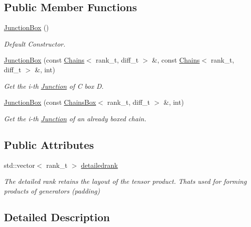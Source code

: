 \subsection*{Public Member Functions}
\begin{DoxyCompactItemize}
\item 
\hyperlink{classMackey_1_1JunctionBox_a6cc2a3bbcbf3e89d7079856b5d16cba4}{Junction\+Box} ()
\begin{DoxyCompactList}\small\item\em Default Constructor. \end{DoxyCompactList}\item 
\hyperlink{classMackey_1_1JunctionBox_ad1847b0ee8aaa343521366f2ff85b7bf}{Junction\+Box} (const \hyperlink{classMackey_1_1Chains}{Chains}$<$ rank\+\_\+t, diff\+\_\+t $>$ \&, const \hyperlink{classMackey_1_1Chains}{Chains}$<$ rank\+\_\+t, diff\+\_\+t $>$ \&, int)
\begin{DoxyCompactList}\small\item\em Get the i-\/th \hyperlink{classMackey_1_1Junction}{Junction} of C box D. \end{DoxyCompactList}\item 
\hyperlink{classMackey_1_1JunctionBox_abd78f76fdc5f83906046e44c6901c54d}{Junction\+Box} (const \hyperlink{classMackey_1_1ChainsBox}{Chains\+Box}$<$ rank\+\_\+t, diff\+\_\+t $>$ \&, int)
\begin{DoxyCompactList}\small\item\em Get the i-\/th \hyperlink{classMackey_1_1Junction}{Junction} of an already boxed chain. \end{DoxyCompactList}\end{DoxyCompactItemize}
\subsection*{Public Attributes}
\begin{DoxyCompactItemize}
\item 
std\+::vector$<$ rank\+\_\+t $>$ \hyperlink{classMackey_1_1JunctionBox_ae1bd899e721eebc9b22ccccf506e774e}{detailedrank}
\begin{DoxyCompactList}\small\item\em The detailed rank retains the layout of the tensor product. That\textquotesingle{}s used for forming products of generators (padding) \end{DoxyCompactList}\end{DoxyCompactItemize}


\subsection{Detailed Description}
